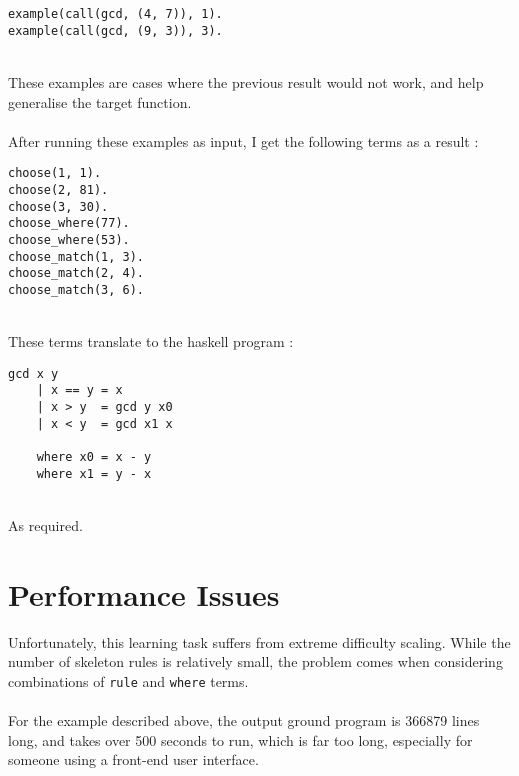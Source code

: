 
\begin{lstlisting}
example(call(gcd, (4, 7)), 1).
example(call(gcd, (9, 3)), 3).
\end{lstlisting}
\mbox{}\\
These examples are cases where the previous result would not work, and help generalise the target function. \\ \\
After running these examples as input, I get the following terms as a result : \\

\begin{lstlisting}
choose(1, 1).
choose(2, 81).
choose(3, 30).
choose_where(77).
choose_where(53).
choose_match(1, 3).
choose_match(2, 4).
choose_match(3, 6).
\end{lstlisting}
\mbox{} \\
These terms translate to the haskell program :

\begin{lstlisting}
gcd x y
	| x == y = x
	| x > y  = gcd y x0
	| x < y  = gcd x1 x
	
	where x0 = x - y
	where x1 = y - x
\end{lstlisting}
\mbox{}\\
As required.

\section{Performance Issues}
Unfortunately, this learning task suffers from extreme difficulty scaling. While the number of skeleton rules is relatively small, the problem comes when considering combinations of \lstinline{rule} and \lstinline{where} terms.\\ \\ %
For the example described above, the output ground program is 366879 lines long, and takes over 500 seconds to run, which is far too long, especially for someone using a front-end user interface.

